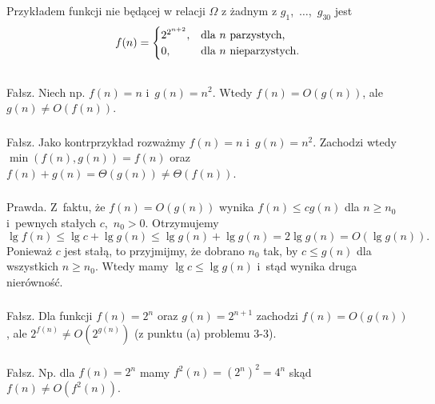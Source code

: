 \subsubsection{} %
Przykładem funkcji nie będącej w relacji $\Omega$ z żadnym z $g_1$,~$\dots$,~$g_{30}$ jest
\[
	f(n) =
	\begin{cases}
		2^{2^{n+2}}, & \hbox{dla }n\hbox{ parzystych,} \\
		0, & \hbox{dla }n\hbox{ nieparzystych}.
	\end{cases}
\]

\subsection{} %

\subsubsection{} %
Fałsz. Niech np. $f(n)=n$ i~$g(n)=n^2$. Wtedy $f(n)=O(g(n))$, ale $g(n)\ne O(f(n))$.

\subsubsection{} %
Fałsz. Jako kontrprzykład rozważmy $f(n)=n$ i~$g(n)=n^2$. Zachodzi wtedy $\min(f(n),g(n))=f(n)$ oraz $f(n)+g(n)=\Theta(g(n))\ne\Theta(f(n))$.

\subsubsection{} %
Prawda. Z~faktu, że $f(n)=O(g(n))$ wynika $f(n)\le cg(n)$ dla $n\ge n_0$ i~pewnych stałych $c$,~$n_0>0$. Otrzymujemy
\[
	\lg f(n) \le \lg c+\lg g(n) \le \lg g(n)+\lg g(n) = 2\lg g(n) = O(\lg g(n)).
\]
Ponieważ $c$ jest stałą, to przyjmijmy, że dobrano $n_0$ tak, by $c\le g(n)$ dla wszystkich $n\ge n_0$. Wtedy mamy $\lg c\le\lg g(n)$ i~stąd wynika druga nierówność.

\subsubsection{} %
Fałsz. Dla funkcji $f(n)=2^n$ oraz $g(n)=2^{n+1}$ zachodzi $f(n)=O(g(n))$, ale $2^{f(n)}\ne O\left(2^{g(n)}\right)$ (z punktu (a) problemu 3-3).

\subsubsection{} %
Fałsz. Np. dla $f(n)=2^n$ mamy $f^2(n)=(2^n)^2=4^n$ skąd $f(n)\ne O\left(f^2(n)\right)$.

